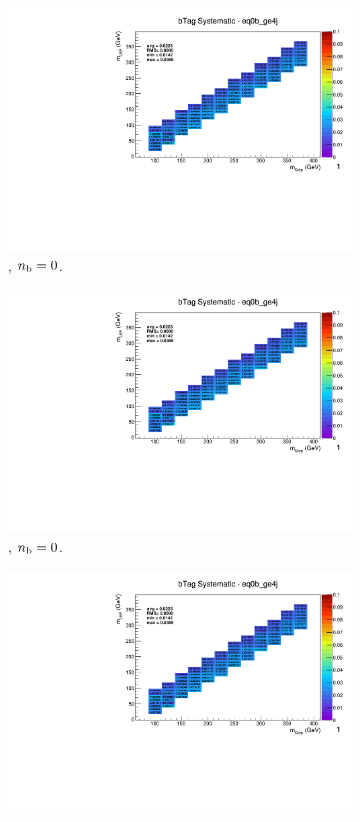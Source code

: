\begin{figure}[ht!]
\begin{subfigure}[b]{0.32\textwidth}
    \includegraphics[width=\textwidth, page=12]{Figs/sms/t2degen/v19_2/systs/T2_4body_bTag_eq0b_ge4j.pdf}
    \caption{\njhigh, $n_{\text{b}} = 0$.}
  \end{subfigure}
  \begin{subfigure}[b]{0.32\textwidth}
    \includegraphics[width=\textwidth, page=8]{Figs/sms/t2degen/v19_2/systs/T2_4body_bTag_eq0b_ge4j.pdf}
    \caption{\njhigh, $n_{\text{b}} = 0$.}
  \end{subfigure}
  \begin{subfigure}[b]{0.32\textwidth}
    \includegraphics[width=\textwidth, page=1]{Figs/sms/t2degen/v19_2/systs/T2_4body_bTag_eq0b_ge4j.pdf}

\end{subfigure}
\end{figure}
